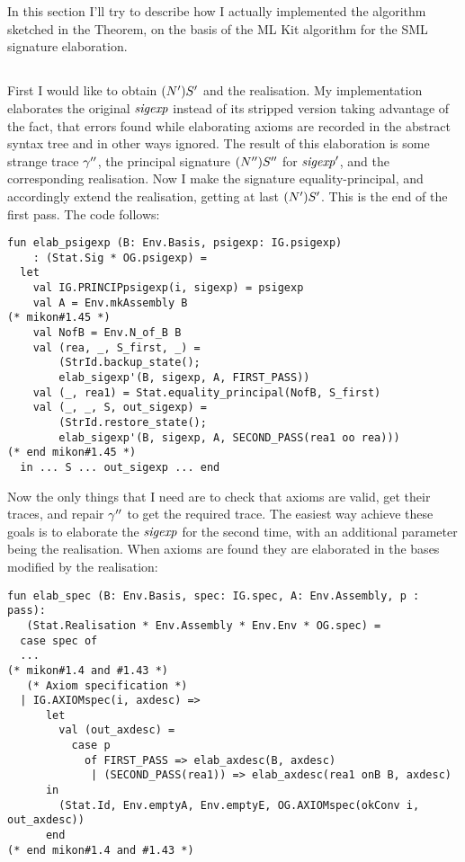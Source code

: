 \section{\secactual}
\label{sec:actual}

In this section I'll try to describe how I actually implemented the algorithm
sketched in the Theorem, on the basis of the ML Kit algorithm for
the SML signature elaboration.

\subsection{\secconventions}
\label{sec:conventions}

\subsection{\secimplaxioms}
\label{sec:impl_axioms}

First I would like to obtain $(N')S'$ and the realisation. 
My implementation elaborates the original ${\it sigexp}$ 
instead of its stripped version taking advantage of the fact, 
that errors found while elaborating axioms are recorded in the
abstract syntax tree and in other ways ignored.
The result of this elaboration is some strange trace $\gamma''$, 
the principal signature $(N'')S''$ for ${\it sigexp}'$,
and the corresponding realisation. Now I make the signature equality-principal,
and accordingly extend the realisation, getting at last $(N')S'$. This is the end of the first pass.
The code follows:
{\small
\begin{verbatim}
fun elab_psigexp (B: Env.Basis, psigexp: IG.psigexp)
    : (Stat.Sig * OG.psigexp) =
  let
    val IG.PRINCIPpsigexp(i, sigexp) = psigexp
    val A = Env.mkAssembly B
(* mikon#1.45 *)
    val NofB = Env.N_of_B B
    val (rea, _, S_first, _) = 
        (StrId.backup_state();
        elab_sigexp'(B, sigexp, A, FIRST_PASS))
    val (_, rea1) = Stat.equality_principal(NofB, S_first)
    val (_, _, S, out_sigexp) = 
        (StrId.restore_state();
        elab_sigexp'(B, sigexp, A, SECOND_PASS(rea1 oo rea)))
(* end mikon#1.45 *)
  in ... S ... out_sigexp ... end
\end{verbatim}
}

Now the only things that I need are to check that axioms are valid, 
get their traces, and repair $\gamma''$ to get the required trace.
The easiest way achieve these goals is to elaborate the ${\it sigexp}$ for the second
time, with an additional parameter being the realisation.
When axioms are found they are elaborated in the bases
modified by the realisation:
{\small
\begin{verbatim}
fun elab_spec (B: Env.Basis, spec: IG.spec, A: Env.Assembly, p : pass): 
   (Stat.Realisation * Env.Assembly * Env.Env * OG.spec) =
  case spec of
  ...
(* mikon#1.4 and #1.43 *)
   (* Axiom specification *)
  | IG.AXIOMspec(i, axdesc) =>
      let
        val (out_axdesc) = 
          case p
            of FIRST_PASS => elab_axdesc(B, axdesc)
             | (SECOND_PASS(rea1)) => elab_axdesc(rea1 onB B, axdesc)
      in
        (Stat.Id, Env.emptyA, Env.emptyE, OG.AXIOMspec(okConv i, out_axdesc))
      end
(* end mikon#1.4 and #1.43 *)
\end{verbatim}
}

